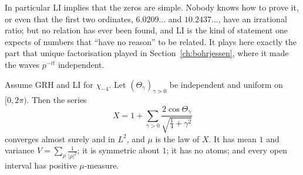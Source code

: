 In particular LI implies that the zeros are simple. Nobody knows how to prove it, or even that the first two ordinates, $6.0209\ldots$ and $10.2437\ldots$, have an irrational ratio; but no relation has ever been found, and LI is the kind of statement one expects of numbers that ``have no reason'' to be related. It plays here exactly the part that unique factorisation played in Section~\ref{ch:bohrjessen}, where it made the waves $p^{-it}$ independent.

\begin{theorem}\label{thm:rubinsteinsarnak}
Assume GRH and LI for $\chi_{-4}$. Let $(\Theta_\gamma)_{\gamma>0}$ be independent and uniform on $[0,2\pi)$. Then the series
\[
X=1+\sum_{\gamma>0}\frac{2\cos\Theta_\gamma}{\sqrt{\frac14+\gamma^2}}
\]
converges almost surely and in $L^2$, and $\mu$ is the law of $X$. It has mean $1$ and variance $V=\sum_\rho\frac1{|\rho|^2}$; it is symmetric about $1$; it has no atoms; and every open interval has positive $\mu$-measure.
\end{theorem}
